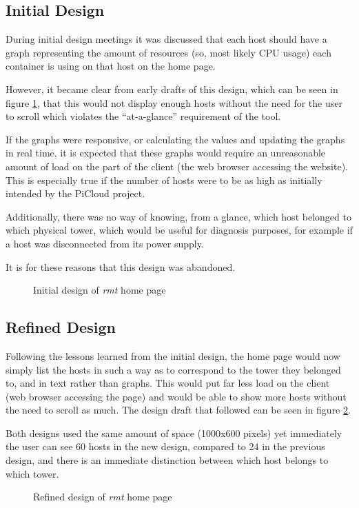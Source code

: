 \subsection{Initial Design}
During initial design meetings it was discussed that each host should have a graph representing the amount of resources (so, most likely CPU usage) each container is using on that host on the home page.

However, it became clear from early drafts of this design, which can be seen in figure \ref{fig:initialDesign}, that this would not display enough hosts without the need for the user to scroll which violates the ``at-a-glance'' requirement of the tool.

If the graphs were responsive, or calculating the values and updating the graphs in real time, it is expected that these graphs would require an unreasonable amount of load on the part of the client (the web browser accessing the website).
This is especially true if the number of hosts were to be as high as initially intended by the PiCloud project.

Additionally, there was no way of knowing, from a glance, which host belonged to which physical tower, which would be useful for diagnosis purposes, for example if a host was disconnected from its power supply. 

It is for these reasons that this design was abandoned.

\begin{figure}[t]
	\centering
	\setlength\fboxsep{0pt}
	\setlength\fboxrule{0.5pt}
	\caption{Initial design of \emph{rmt} home page}
	\label{fig:initialDesign}
\end{figure}

\subsection{Refined Design}

Following the lessons learned from the initial design, the home page would now simply list the hosts in such a way as to correspond to the tower they belonged to, and in text rather than graphs.
This would put far less load on the client (web browser accessing the page) and would be able to show more hosts without the need to scroll as much.
The design draft that followed can be seen in figure \ref{fig:refinedDesign}.

Both designs used the same amount of space (1000x600 pixels) yet immediately the user can see 60 hosts in the new design, compared to 24 in the previous design, and there is an immediate distinction between which host belongs to which tower.

\begin{figure}[t]
	\centering
	\setlength\fboxsep{0pt}
	\setlength\fboxrule{0.5pt}
	\caption{Refined design of \emph{rmt} home page}
	\label{fig:refinedDesign}
\end{figure}
